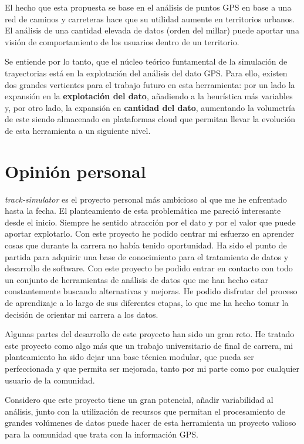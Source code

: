 El hecho que esta propuesta se base en el análisis de puntos \ac{GPS} en base a una 
red de caminos y carreteras hace que su utilidad aumente en territorios urbanos. El 
análisis de una cantidad elevada de datos (orden del millar) puede aportar una visión de 
comportamiento de los usuarios dentro de un territorio.

Se entiende por lo tanto, que el núcleo teórico funtamental de la simulación de 
trayectorias está en la explotación del análisis del dato \ac{GPS}. Para ello, existen dos 
grandes vertientes para el trabajo futuro en esta herramienta: por un lado la expansión 
en la \textbf{explotación del dato}, añadiendo a la heurística más variables y, por otro 
lado, la expansión en \textbf{cantidad del dato}, aumentando la volumetría de este 
siendo almacenado en plataformas cloud que permitan llevar la evolución de esta 
herramienta a un siguiente nivel.

\section{Opinión personal}
\textit{track-simulator} es el proyecto personal más ambicioso al que me he enfrentado 
hasta la fecha. El planteamiento de esta problemática me pareció interesante desde el 
inicio. Siempre he sentido atracción por el dato y por el valor que puede aportar 
explotarlo. Con este proyecto he podido centrar mi esfuerzo en aprender cosas que 
durante la carrera no había tenido oportunidad. Ha sido el punto de partida para adquirir 
una base de conocimiento para el tratamiento de datos y desarrollo de software. Con 
este proyecto he podido entrar en contacto con todo un conjunto de herramientas de 
análisis de datos que me han hecho estar constantemente buscando alternativas y 
mejoras. He podido disfrutar del proceso de aprendizaje a lo largo de sus diferentes 
etapas, lo que me ha hecho tomar la decisión de orientar mi carrera a los datos.

Algunas partes del desarrollo de este proyecto han sido un gran reto. He tratado este 
proyecto como algo más que un trabajo universitario de final de carrera, mi 
planteamiento ha sido dejar una base técnica modular, que pueda ser perfeccionada y 
que permita ser mejorada, tanto por mi parte como por cualquier usuario de la 
comunidad.

Considero que este proyecto tiene un gran potencial, añadir variabilidad al análisis, 
junto con la utilización de recursos que permitan el procesamiento de grandes 
volúmenes de datos puede hacer de esta herramienta un proyecto valioso para la 
comunidad que trata con la información \ac{GPS}.

